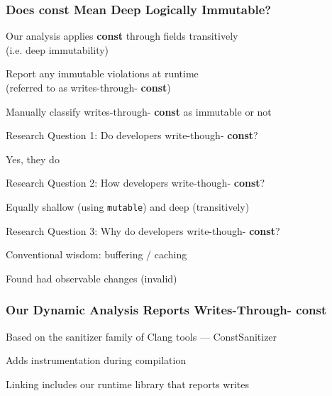 \documentclass[aspectratio=169]{beamer}
\newcommand{\const}{{\color{blue} \bfseries \ttfamily const}}
\begin{document}
  \begin{frame}
    \frametitle{Does \const{} Mean Deep Logically Immutable?}
    \Large

    Our analysis applies \const{} through fields transitively
    \\(i.e. deep immutability)

    \vspace{1em}
    Report any  immutable violations at runtime
    \\(referred to as writes-through-\const{})

    \vspace{1em}
    Manually classify writes-through-\const{} as  immutable
    or not
  \end{frame}

  \begin{frame}
    \Large
    {
     Research Question 1: Do developers write-though-\const{}?}

    \vspace{1em}
    Yes, they do
  \end{frame}

  \begin{frame}
    \Large
    {
     Research Question 2: How developers write-though-\const{}?}

    \vspace{1em}
    Equally shallow (using \texttt{mutable}) and deep (transitively)
  \end{frame}

  \begin{frame}
    \Large
    {
     Research Question 3: Why do developers write-though-\const{}?}

    \vspace{1em}
    Conventional wisdom: buffering / caching

    \vspace{1em}
    Found  had observable changes (invalid)
  \end{frame}

  \begin{frame}
    \frametitle{Our Dynamic Analysis Reports Writes-Through-\const{}}
    \Large
    Based on the sanitizer family of Clang tools --- ConstSanitizer

    \vspace{1em}
    Adds instrumentation during compilation

    \vspace{1em}
    Linking includes our runtime library that reports writes
  \end{frame}
\end{document}
